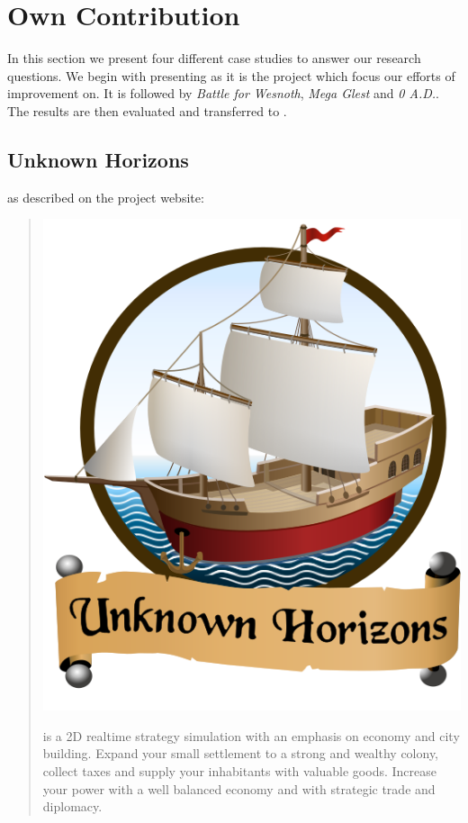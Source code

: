 \section{Own Contribution}
In this section we present four different case studies to answer our research questions. We begin with presenting
\UH{} as it is the project which focus our efforts of improvement on. It is followed by \textit{Battle for
Wesnoth}, \textit{Mega Glest} and \textit{0 A.D.}.
The results are then evaluated and transferred to \UH{}.

\subsection{Unknown Horizons}
\UH{} as described on the project website:
\begin{quote}

\begin{center}\includegraphics[scale=0.2]{pics/uhlogo}\end{center}

\UH{} is a 2D realtime strategy simulation with an emphasis on economy and city building. Expand your small settlement to a strong and wealthy colony, collect taxes and supply your inhabitants with valuable goods. Increase your power with a well balanced economy and with strategic trade and diplomacy.
\end{quote}

